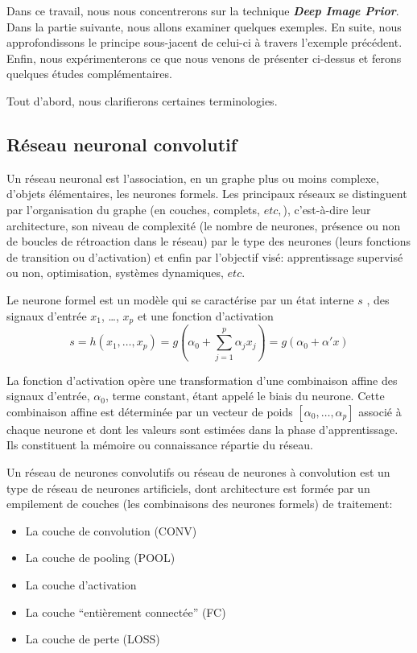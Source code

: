 \documentclass[
  11pt,
  dvipsnames]{article}
\providecommand{\tightlist}{%
  \setlength{\itemsep}{0pt}\setlength{\parskip}{0pt}}
\begin{document}
Dans ce travail, nous nous concentrerons sur la technique \textbf{\emph{Deep Image Prior}}. Dans la partie suivante, nous allons examiner quelques exemples. En suite, nous approfondissons le principe sous-jacent de celui-ci à travers l'exemple précédent. Enfin, nous expérimenterons ce que nous venons de présenter ci-dessus et ferons quelques études complémentaires.

Tout d'abord, nous clarifierons certaines terminologies.

\hypertarget{ruxe9seau-neuronal-convolutif}{%
\subsection{Réseau neuronal convolutif}\label{ruxe9seau-neuronal-convolutif}}

Un réseau neuronal est l'association, en un graphe plus ou moins complexe, d'objets élémentaires, les neurones formels. Les principaux réseaux se distinguent par l'organisation du graphe (en couches, complets, \(etc,\)), c'est-à-dire leur architecture, son niveau de complexité (le nombre de neurones, présence ou non de boucles de rétroaction dans le réseau) par le type des neurones (leurs fonctions de transition ou d'activation) et enfin par l'objectif visé: apprentissage supervisé ou non, optimisation, systèmes dynamiques, \(etc.\)

Le neurone formel est un modèle qui se caractérise par un état interne \(s\) , des signaux d'entrée \(x_{1}\), \dots, \(x_{p}\) et une fonction d'activation
\[ s=h(x_{1},\dots,x_{p})=g(\alpha_{0} + \sum_{j=1}^{p} \alpha_{j}x_{j}) = g(\alpha_{0} + \alpha' x)\]

La fonction d'activation opère une transformation d'une combinaison affine des signaux d'entrée, \(\alpha_{0}\), terme constant, étant appelé le biais du neurone. Cette combinaison affine est déterminée par un vecteur de poids \([\alpha_{0},\dots,\alpha_{p}]\) associé à chaque neurone et dont les valeurs sont estimées dans la phase d'apprentissage. Ils constituent la mémoire ou connaissance répartie du réseau.

Un réseau de neurones convolutifs ou réseau de neurones à convolution est un type de réseau de neurones artificiels, dont architecture est formée par un empilement de couches (les combinaisons des neurones formels) de traitement:

\begin{itemize}
\tightlist
\item
  La couche de convolution (CONV)
\item
  La couche de pooling (POOL)
\item
  La couche d'activation
\item
  La couche ``entièrement connectée'' (FC)
\item
  La couche de perte (LOSS)
\end{itemize}
\end{document}
